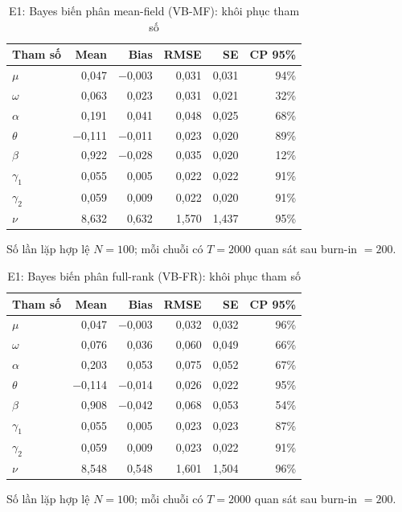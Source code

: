 \documentclass[11pt,a4paper]{article}
\begin{document}
\begin{table}[H]\centering\footnotesize
\caption{E1: Bayes biến phân mean-field (VB-MF): khôi phục tham số}\label{tab:E1-vb_mean_field}
\begin{tabular}{l r r r r r}
\toprule
\textbf{Tham số} & \textbf{Mean} & \textbf{Bias} & \textbf{RMSE} & \textbf{SE} & \textbf{CP 95\%} \\
\midrule
$\mu$ & 0,047 & $-$0,003 & 0,031 & 0,031 & 94\% \\
$\omega$ & 0,063 & 0,023 & 0,031 & 0,021 & 32\% \\
$\alpha$ & 0,191 & 0,041 & 0,048 & 0,025 & 68\% \\
$\theta$ & $-$0,111 & $-$0,011 & 0,023 & 0,020 & 89\% \\
$\beta$ & 0,922 & $-$0,028 & 0,035 & 0,020 & 12\% \\
$\gamma_1$ & 0,055 & 0,005 & 0,022 & 0,022 & 91\% \\
$\gamma_2$ & 0,059 & 0,009 & 0,022 & 0,020 & 91\% \\
$\nu$ & 8,632 & 0,632 & 1,570 & 1,437 & 95\% \\
\bottomrule
\end{tabular}
\par\vspace{0.25em}\begin{minipage}{0.95\textwidth}\scriptsize Số lần lặp hợp lệ $N=100$; mỗi chuỗi có $T=2000$ quan sát sau burn-in $=200$. \end{minipage}
\end{table}

\begin{table}[H]\centering\footnotesize
\caption{E1: Bayes biến phân full-rank (VB-FR): khôi phục tham số}\label{tab:E1-vb_full_rank}
\begin{tabular}{l r r r r r}
\toprule
\textbf{Tham số} & \textbf{Mean} & \textbf{Bias} & \textbf{RMSE} & \textbf{SE} & \textbf{CP 95\%} \\
\midrule
$\mu$ & 0,047 & $-$0,003 & 0,032 & 0,032 & 96\% \\
$\omega$ & 0,076 & 0,036 & 0,060 & 0,049 & 66\% \\
$\alpha$ & 0,203 & 0,053 & 0,075 & 0,052 & 67\% \\
$\theta$ & $-$0,114 & $-$0,014 & 0,026 & 0,022 & 95\% \\
$\beta$ & 0,908 & $-$0,042 & 0,068 & 0,053 & 54\% \\
$\gamma_1$ & 0,055 & 0,005 & 0,023 & 0,023 & 87\% \\
$\gamma_2$ & 0,059 & 0,009 & 0,023 & 0,022 & 91\% \\
$\nu$ & 8,548 & 0,548 & 1,601 & 1,504 & 96\% \\
\bottomrule
\end{tabular}
\par\vspace{0.25em}\begin{minipage}{0.95\textwidth}\scriptsize Số lần lặp hợp lệ $N=100$; mỗi chuỗi có $T=2000$ quan sát sau burn-in $=200$. \end{minipage}
\end{table}
\end{document}
